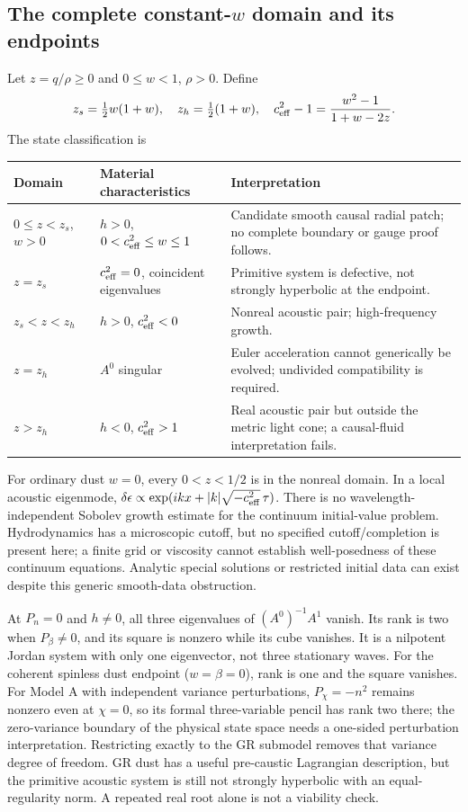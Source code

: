 \subsection{The complete constant-$w$ domain and its endpoints}
Let $z=q/\rho\geq0$ and $0\leq w<1$, $\rho>0$. Define
\begin{equation}
 z_s=\tfrac12w(1+w),\quad z_h=\tfrac12(1+w),\quad
 c_{\rm eff}^2-1=\frac{w^2-1}{1+w-2z}.
\end{equation}
The state classification is
\begin{longtable}{p{}p{}p{}}
\toprule Domain & Material characteristics & Interpretation\\\midrule\endhead
$0\leq z<z_s$, $w>0$ & $h>0$, $0<c_{\rm eff}^2\leq w\leq1$ & Candidate smooth causal radial patch; no complete boundary or gauge proof follows.\\
$z=z_s$ & $c_{\rm eff}^2=0$, coincident eigenvalues & Primitive system is defective, not strongly hyperbolic at the endpoint.\\
$z_s<z<z_h$ & $h>0$, $c_{\rm eff}^2<0$ & Nonreal acoustic pair; high-frequency growth.\\
$z=z_h$ & $A^0$ singular & Euler acceleration cannot generically be evolved; undivided compatibility is required.\\
$z>z_h$ & $h<0$, $c_{\rm eff}^2>1$ & Real acoustic pair but outside the metric light cone; a causal-fluid interpretation fails.\\\bottomrule
\end{longtable}
For ordinary dust $w=0$, every $0<z<1/2$ is in the nonreal domain. In a local acoustic eigenmode, $\delta\epsilon\propto\exp(ikx+|k|\sqrt{-c_{\rm eff}^2}\,\tau)$. There is no wavelength-independent Sobolev growth estimate for the continuum initial-value problem. Hydrodynamics has a microscopic cutoff, but no specified cutoff/completion is present here; a finite grid or viscosity cannot establish well-posedness of these continuum equations. Analytic special solutions or restricted initial data can exist despite this generic smooth-data obstruction.

At $P_n=0$ and $h\ne0$, all three eigenvalues of $(A^0)^{-1}A^1$ vanish. Its rank is two when $P_\beta\ne0$, and its square is nonzero while its cube vanishes. It is a nilpotent Jordan system with only one eigenvector, not three stationary waves. For the coherent spinless dust endpoint ($w=\beta=0$), rank is one and the square vanishes. For Model A with independent variance perturbations, $P_\chi=-n^2$ remains nonzero even at $\chi=0$, so its formal three-variable pencil has rank two there; the zero-variance boundary of the physical state space needs a one-sided perturbation interpretation. Restricting exactly to the GR submodel removes that variance degree of freedom. GR dust has a useful pre-caustic Lagrangian description, but the primitive acoustic system is still not strongly hyperbolic with an equal-regularity norm. A repeated real root alone is not a viability check.

